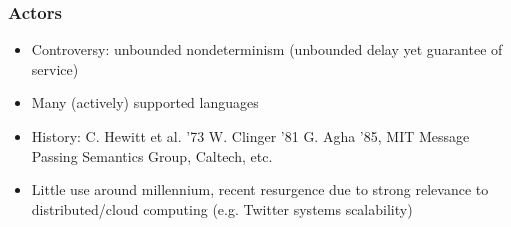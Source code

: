 \begin{frame}
\frametitle{Actors}
\begin{itemize}
\item Controversy: unbounded nondeterminism (unbounded delay yet guarantee of service)
\item Many (actively) supported languages
\item History: C. Hewitt et al. '73 \textrightarrow{} W. Clinger '81 \textrightarrow{} G. Agha '85, MIT Message Passing Semantics Group, Caltech, etc.
\item Little use around millennium, recent resurgence due to strong relevance to distributed/cloud computing (e.g. Twitter systems scalability)
\end{itemize}
\end{frame}

